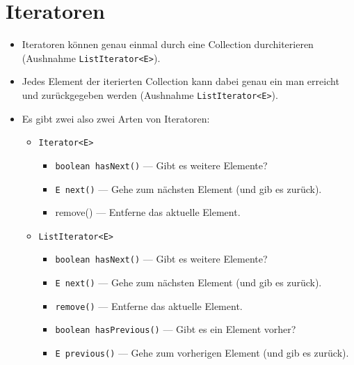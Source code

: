 



\newpage
\section{Iteratoren}

\begin{itemize}
	\item Iteratoren können genau einmal durch eine Collection
		durchiterieren (Aushnahme \lstinline{ListIterator<E>}).
	\item Jedes Element der iterierten Collection kann dabei genau
		ein man erreicht und zurückgegeben werden
		(Aushnahme \lstinline{ListIterator<E>}).
	\item Es gibt zwei also zwei Arten von Iteratoren:
		\begin{itemize}
			\item \lstinline{Iterator<E>}
				\begin{itemize}
					\item \lstinline{boolean hasNext()} --- Gibt es weitere Elemente?
					\item \lstinline{E next()} --- Gehe zum nächsten Element (und gib es zurück).
					\item remove() --- Entferne das aktuelle Element.
				\end{itemize}

			\item \lstinline{ListIterator<E>}
					\begin{itemize}
					\item \lstinline{boolean hasNext()} --- Gibt es weitere Elemente?
					\item \lstinline{E next()} --- Gehe zum nächsten Element (und gib es zurück).
					\item \lstinline{remove()} --- Entferne das aktuelle Element.
					\item \lstinline{boolean hasPrevious()} --- Gibt es ein Element vorher?
					\item \lstinline{E previous()} --- Gehe zum vorherigen Element (und gib es zurück).
				\end{itemize}

		\end{itemize}
\end{itemize}
